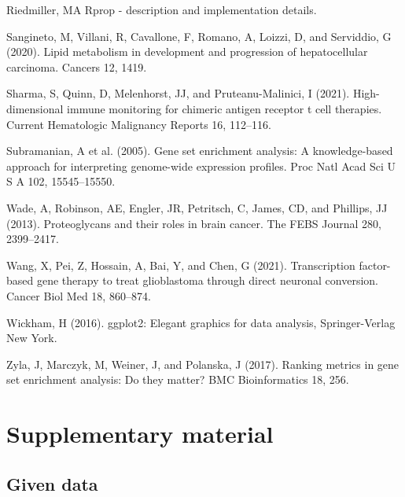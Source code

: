 \documentclass[
  11pt,
  parskip,
  oneside]{scrreprt}
\newlength{\cslhangindent}
\newlength{\cslentryspacingunit} %
\newenvironment{CSLReferences}[2] %
 {%
  \setlength{\parindent}{0pt}
  \ifodd #1
  \let\oldpar\par
  \def\par{\hangindent=\cslhangindent\oldpar}
  \fi
  \setlength{\parskip}{#2\cslentryspacingunit}
 }%
 {}
\begin{document}
\begin{CSLReferences}{0}{0}
\leavevmode{}%
Riedmiller, MA Rprop - description and implementation details.

\leavevmode{}%
Sangineto, M, Villani, R, Cavallone, F, Romano, A, Loizzi, D, and
Serviddio, G (2020). Lipid metabolism in development and progression of
hepatocellular carcinoma. Cancers 12, 1419.

\leavevmode{}%
Sharma, S, Quinn, D, Melenhorst, JJ, and Pruteanu-Malinici, I (2021).
High-dimensional immune monitoring for chimeric antigen receptor t cell
therapies. Current Hematologic Malignancy Reports 16, 112--116.

\leavevmode{}%
Subramanian, A et al. (2005). Gene set enrichment analysis: A
knowledge-based approach for interpreting genome-wide expression
profiles. Proc Natl Acad Sci U S A 102, 15545--15550.

\leavevmode{}%
Wade, A, Robinson, AE, Engler, JR, Petritsch, C, James, CD, and
Phillips, JJ (2013). Proteoglycans and their roles in brain cancer. The
FEBS Journal 280, 2399--2417.

\leavevmode{}%
Wang, X, Pei, Z, Hossain, A, Bai, Y, and Chen, G (2021). Transcription
factor-based gene therapy to treat glioblastoma through direct neuronal
conversion. Cancer Biol Med 18, 860--874.

\leavevmode{}%
Wickham, H (2016). ggplot2: Elegant graphics for data analysis,
Springer-Verlag New York.

\leavevmode{}%
Zyla, J, Marczyk, M, Weiner, J, and Polanska, J (2017). Ranking metrics
in gene set enrichment analysis: Do they matter? BMC Bioinformatics 18,
256.

\end{CSLReferences}

\clearpage

\hypertarget{supplementary-material}{%
\chapter{Supplementary material}\label{supplementary-material}}

\hypertarget{given-data}{%
\section{Given data}\label{given-data}}
\end{document}
